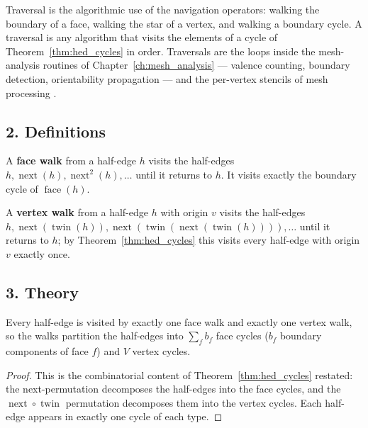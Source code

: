 Traversal is the algorithmic use of the navigation operators: walking the
boundary of a face, walking the star of a vertex, and walking a boundary
cycle. A traversal is any algorithm that visits the elements of a cycle of
Theorem~\ref{thm:hed_cycles} in order. Traversals are the loops inside the
mesh-analysis routines of Chapter~\ref{ch:mesh_analysis} --- valence
counting, boundary detection, orientability propagation --- and the
per-vertex stencils of mesh processing \cite{botsch2010}.

\subsection{2. Definitions}

\begin{definition}\label{def:hed_face_walk}
A \textbf{face walk} from a half-edge $h$ visits the half-edges
$h, \operatorname{next}(h), \operatorname{next}^2(h), \dots$ until it
returns to $h$. It visits exactly the boundary cycle of
$\operatorname{face}(h)$.
\end{definition}

\begin{definition}\label{def:hed_vertex_walk}
A \textbf{vertex walk} from a half-edge $h$ with origin $v$ visits the
half-edges $h, \operatorname{next}(\operatorname{twin}(h)),
\operatorname{next}(\operatorname{twin}(\operatorname{next}(\operatorname{twin}(h)))), \dots$
until it returns to $h$; by Theorem~\ref{thm:hed_cycles} this visits every
half-edge with origin $v$ exactly once.
\end{definition}

\subsection{3. Theory}

\begin{theorem}\label{thm:hed_cycle_cover}
Every half-edge is visited by exactly one face walk and exactly one vertex
walk, so the walks partition the half-edges into $\sum_f b_f$ face cycles
($b_f$ boundary components of face $f$) and $V$ vertex cycles.
\end{theorem}

\begin{proof}
This is the combinatorial content of Theorem~\ref{thm:hed_cycles}
restated: the next-permutation decomposes the half-edges into the face
cycles, and the $\operatorname{next} \circ \operatorname{twin}$ permutation
decomposes them into the vertex cycles. Each half-edge appears in exactly
one cycle of each type.
\end{proof}

